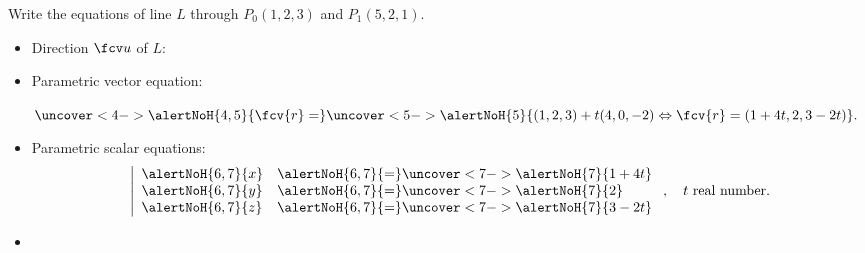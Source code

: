 \begin{frame}
\begin{example}

Write the equations of line $L$ through $P_0(1,2,3)$ and $P_1(5,2,1)$.

\begin{itemize}
\item<2-> Direction $\fcv u$ of $L$: 
\item<4-> Parametric vector equation:

$  \uncover<4->{\alertNoH{4,5}{\fcv{r}=}} \uncover<5->{
\alertNoH{5}{
( 1,2,3) + t ( 4, 0, -2) \Leftrightarrow  \fcv{r} = ( 1+4t, 2, 3-2t)
} .}
$
\item<6-> Parametric scalar equations:
\[\left|
\begin{array}{ll}
\alertNoH{6,7}{x} & \alertNoH{6,7}{=}\uncover<7->{\alertNoH{7}{ 1+4t}} \\
\alertNoH{6,7}{y} & \alertNoH{6,7}{=}\uncover<7->{\alertNoH{7}{ 2 }}\\
\alertNoH{6,7}{z} & \alertNoH{6,7}{=}\uncover<7->{\alertNoH{7}{ 3-2t}}
\end{array}
\right. , \quad t \text{ real number.}\]
%
\item<8-> 
\end{itemize}
\end{example}
\end{frame}
